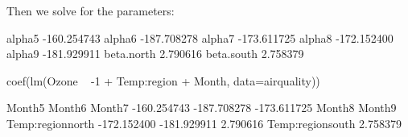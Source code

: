 Then we solve for the parameters:
\begin{Schunk}
\begin{Soutput}
                  [,1]
alpha5     -160.254743
alpha6     -187.708278
alpha7     -173.611725
alpha8     -172.152400
alpha9     -181.929911
beta.north    2.790616
beta.south    2.758379
\end{Soutput}
\begin{Sinput}
 coef(lm(Ozone ~ -1 + Temp:region + Month, data=airquality))
\end{Sinput}
\begin{Soutput}
          Month5           Month6           Month7 
     -160.254743      -187.708278      -173.611725 
          Month8           Month9 Temp:regionnorth 
     -172.152400      -181.929911         2.790616 
Temp:regionsouth 
        2.758379 
\end{Soutput}
\end{Schunk}





